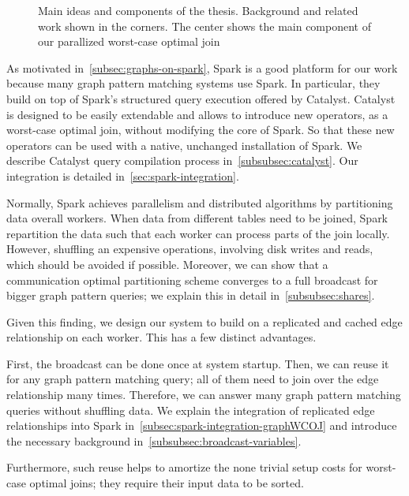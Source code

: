 \begin{figure}
    \centering
    
    \caption{
    Main ideas and components of the thesis.
    Background and related work shown in the corners.
    The center shows the main component of our parallized worst-case optimal join
    }
\end{figure}

As motivated in~\cref{subsec:graphs-on-spark}, Spark is a good platform for our work because many graph pattern matching systems use
Spark.
In particular, they build on top of Spark's structured query execution offered by Catalyst.
Catalyst is designed to be easily extendable and allows to introduce new operators, as a worst-case optimal join,
without modifying the core of Spark.
So that these new operators can be used with a native, unchanged installation of Spark.
We describe Catalyst query compilation process in~\cref{subsubsec:catalyst}.
Our integration is detailed in~\cref{sec:spark-integration}.

Normally, Spark achieves parallelism and distributed algorithms by partitioning data overall workers.
When data from different tables need to be joined, Spark repartition the data such that each worker can process parts of the join locally.
However, shuffling an expensive operations, involving disk writes and reads, which should be avoided if possible.
Moreover, we can show that a communication optimal partitioning scheme converges to a full broadcast for bigger graph pattern queries;
we explain this in detail in~\cref{subsubsec:shares}.

Given this finding, we design our system to build on a replicated and cached edge relationship on each worker.
This has a few distinct advantages.


First, the broadcast can be done once at system startup.
Then, we can reuse it for any graph pattern matching query;
all of them need to join over the edge relationship many times.
Therefore, we can answer many graph pattern matching queries without shuffling data.
We explain the integration of replicated edge relationships into Spark in~\cref{subsec:spark-integration-graphWCOJ} and introduce
the necessary background in~\cref{subsubsec:broadcast-variables}.

Furthermore, such reuse helps to amortize the none trivial setup costs for worst-case optimal joins;
they require their input data to be sorted.

